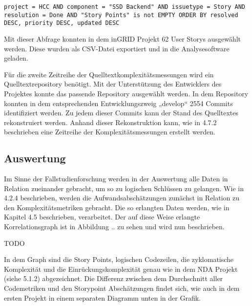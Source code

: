 \lstset{language=SQL}
\begin{lstlisting}
project = HCC AND component = "SSD Backend" AND issuetype = Story AND resolution = Done AND "Story Points" is not EMPTY ORDER BY resolved DESC, priority DESC, updated DESC
\end{lstlisting}

Mit dieser Abfrage konnten in dem inGRID Projekt 62 User Storys
ausgewählt werden. Diese wurden als CSV-Datei exportiert und in die
Analysesoftware geladen.

Für die zweite Zeitreihe der Quelltextkomplexitätsmessungen wird ein
Quelltextrepository benötigt. Mit der Unterstützung des Entwicklers des
Projektes konnte das passende Repository ausgewählt werden. In dem
Repository konnten in dem entsprechenden Entwicklungszweig „develop``
2554 Commits identifiziert werden. Zu jedem dieser Commits kann der
Stand des Quelltextes rekonstruiert werden. Anhand dieser Rekonstruktion
kann, wie in 4.7.2 beschrieben eine Zeitreihe der Komplexitätsmessungen
erstellt werden.

\subsection{Auswertung}\label{-ingrid-Auswertung}

Im Sinne der Fallstudienforschung werden in der Auswertung alle Daten in
Relation zueinander gebracht, um so zu logischen Schlüssen zu gelangen.
Wie in 4.2.4 beschrieben, werden die Aufwandsabschätzungen zunächst in
Relation zu den Komplexitätsmetriken gebracht. Die so erlangten Daten
werden, wie in Kapitel 4.5 beschrieben, verarbeitet. Der auf diese Weise
erlangte Korrelationsgraph ist in Abbildung .. zu sehen und wird nun
beschrieben.

TODO

In dem Graph sind die Story Points, logischen Codezeilen, die
zyklomatische Komplexität und die Einrückungskomplexität genau wie in
dem NDA Projekt (siehe 5.1.2) abgezeichnet. Die Differenz zwischen dem
Durchschnitt aller Codemetriken und den Storypoint Abschätzungen findet
sich, wie auch in dem ersten Projekt in einem separaten Diagramm unten
in der Grafik.

